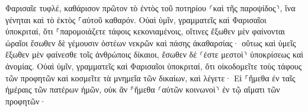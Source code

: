 \documentclass{openreader}
\begin{document}
Φαρισαῖε τυφλέ, καθάρισον πρῶτον τὸ ἐντὸς τοῦ ποτηρίου ⸂καὶ τῆς παροψίδος⸃, ἵνα γένηται καὶ τὸ ἐκτὸς ⸀αὐτοῦ καθαρόν. 
Οὐαὶ ὑμῖν, γραμματεῖς καὶ Φαρισαῖοι ὑποκριταί, ὅτι ⸀παρομοιάζετε τάφοις κεκονιαμένοις, οἵτινες ἔξωθεν μὲν φαίνονται ὡραῖοι ἔσωθεν δὲ γέμουσιν ὀστέων νεκρῶν καὶ πάσης ἀκαθαρσίας· 
οὕτως καὶ ὑμεῖς ἔξωθεν μὲν φαίνεσθε τοῖς ἀνθρώποις δίκαιοι, ἔσωθεν δέ ⸂ἐστε μεστοὶ⸃ ὑποκρίσεως καὶ ἀνομίας. 
Οὐαὶ ὑμῖν, γραμματεῖς καὶ Φαρισαῖοι ὑποκριταί, ὅτι οἰκοδομεῖτε τοὺς τάφους τῶν προφητῶν καὶ κοσμεῖτε τὰ μνημεῖα τῶν δικαίων, 
καὶ λέγετε· Εἰ ⸀ἤμεθα ἐν ταῖς ἡμέραις τῶν πατέρων ἡμῶν, οὐκ ἂν ⸁ἤμεθα ⸂αὐτῶν κοινωνοὶ⸃ ἐν τῷ αἵματι τῶν προφητῶν· 
\end{document}
